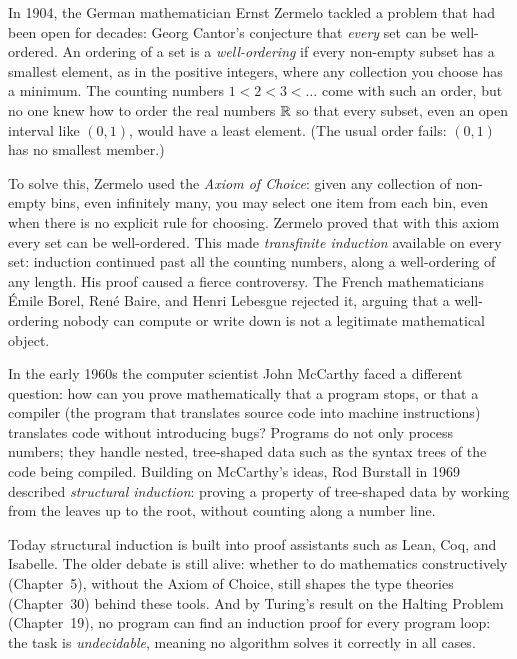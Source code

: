\begin{historybox}
In 1904, the German mathematician Ernst Zermelo tackled a problem that had been open for decades: Georg Cantor's conjecture that \emph{every} set can be well-ordered. An ordering of a set is a \emph{well-ordering} if every non-empty subset has a smallest element, as in the positive integers, where any collection you choose has a minimum. The counting numbers $1 < 2 < 3 < \dots$ come with such an order, but no one knew how to order the real numbers $\mathbb{R}$ so that every subset, even an open interval like $(0, 1)$, would have a least element. (The usual order fails: $(0,1)$ has no smallest member.)

To solve this, Zermelo used the \emph{Axiom of Choice}: given any collection of non-empty bins, even infinitely many, you may select one item from each bin, even when there is no explicit rule for choosing. Zermelo proved that with this axiom every set can be well-ordered. This made \emph{transfinite induction} available on every set: induction continued past all the counting numbers, along a well-ordering of any length. His proof caused a fierce controversy. The French mathematicians \'Emile Borel, Ren\'e Baire, and Henri Lebesgue rejected it, arguing that a well-ordering nobody can compute or write down is not a legitimate mathematical object.

In the early 1960s the computer scientist John McCarthy faced a different question: how can you prove mathematically that a program stops, or that a compiler (the program that translates source code into machine instructions) translates code without introducing bugs? Programs do not only process numbers; they handle nested, tree-shaped data such as the syntax trees of the code being compiled. Building on McCarthy's ideas, Rod Burstall in 1969 described \emph{structural induction}: proving a property of tree-shaped data by working from the leaves up to the root, without counting along a number line.

Today structural induction is built into proof assistants such as Lean, Coq, and Isabelle. The older debate is still alive: whether to do mathematics constructively (Chapter~5), without the Axiom of Choice, still shapes the type theories (Chapter~30) behind these tools. And by Turing's result on the Halting Problem (Chapter~19), no program can find an induction proof for every program loop: the task is \emph{undecidable}, meaning no algorithm solves it correctly in all cases.
\end{historybox}

